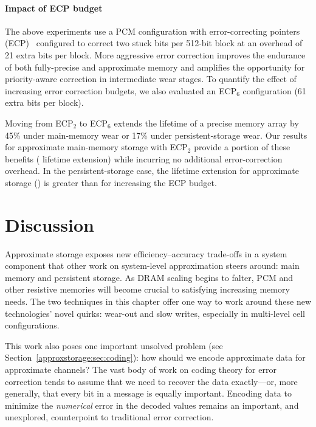 \paragraph{Impact of ECP budget} The above experiments use a PCM configuration
with error-correcting pointers (ECP)~\cite{ecp} configured to correct two stuck
bits per 512-bit block at an overhead of 21 extra bits per block. More
aggressive error correction improves the endurance of both fully-precise and
approximate memory and amplifies the opportunity for priority-aware
correction in intermediate wear stages. To quantify the effect of increasing
error correction budgets, we also evaluated an ECP$_6$ configuration (61 extra
bits per block).

Moving from ECP$_2$ to ECP$_6$ extends the lifetime of a precise memory array
by 45\% under main-memory wear or 17\% under persistent-storage wear.
Our
results for approximate main-memory storage with ECP$_2$ provide a
portion of these benefits ( lifetime extension) while incurring no
additional error-correction overhead. In the persistent-storage case, the
lifetime extension for approximate storage () is greater than for
increasing the ECP budget.




\section{Discussion}
\label{approxstorage:sec:conclusion}

Approximate storage exposes new efficiency--accuracy trade-offs in a system
component that other work on system-level approximation steers around:
main memory and persistent storage.
As DRAM scaling begins to falter, PCM and other resistive memories will become
crucial to satisfying increasing memory needs.
The two techniques in this chapter offer one way to work around these new
technologies' novel quirks:
wear-out and slow
writes, especially in multi-level cell configurations.

This work also poses one important unsolved problem (see
Section~\ref{approxstorage:sec:coding}):
how should we encode approximate data for approximate channels?
The vast body of work on coding theory for error correction tends to assume
that we need to recover the data exactly---or, more generally, that every bit
in a message is equally important.
Encoding data to minimize the \emph{numerical} error in the decoded values
remains an important, and unexplored, counterpoint to traditional
error correction.
